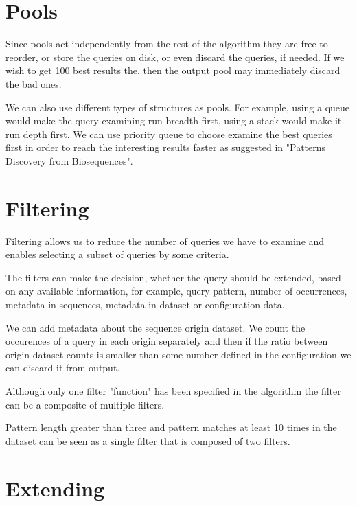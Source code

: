 \section{Pools}

Since pools act independently from the rest of the algorithm they are free to reorder, or store the queries on disk, or even discard the queries, if needed. If we wish to get 100 best results the, then the output pool may immediately discard the bad ones.

We can also use different types of structures as pools. For example, using a queue would make the query examining run breadth first, using a stack would make it run depth first. We can use priority queue to choose examine the best queries first in order to reach the interesting results faster as suggested in "Patterns Discovery from Biosequences"\cite{spexs}.

\section{Filtering}

Filtering allows us to reduce the number of queries we have to examine and enables selecting a subset of queries by some criteria.

The filters can make the decision, whether the query should be extended, based on any available information, for example, query pattern, number of occurrences, metadata in sequences, metadata in dataset or configuration data.

\begin{exmp}
We can add metadata about the sequence origin dataset. We count the occurences of a query in each origin separately and then if the ratio between origin dataset counts is smaller than some number defined in the configuration we can discard it from output.
\end{exmp}

Although only one filter "function" has been specified in the algorithm the filter can be a composite of multiple filters.

\begin{exmp}
Pattern length greater than three and pattern matches at least 10 times in the dataset can be seen as a single filter that is composed of two filters.
\end{exmp}

\section{Extending}

